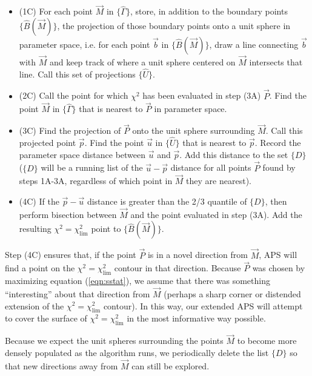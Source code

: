 \documentclass[useAMS,usenatbib]{aastex}
\begin{document}
\begin{itemize}
\item(1C) For each point $\vec{M}$ in $\{\hat{\Gamma}\}$, store, 
in addition to the boundary
points $\{\hat{B}(\vec{M})\}$, the projection of those boundary points
onto a unit sphere in parameter space, i.e. for each point $\vec{b}$ in $\{\hat{B}(\vec{M})\}$, draw a line
connecting $\vec{b}$ with $\vec{M}$ and keep track of
where a unit sphere centered on $\vec{M}$ intersects that line.  Call this set
of projections $\{\hat{U}\}$.
\\
\item(2C) Call the point for which $\chi^2$ has been evaluated in step (3A)
$\vec{P}$.  Find the
point $\vec{M}$ in $\{\hat{\Gamma}\}$ that is nearest to $\vec{P}$ in parameter space.
\\
\item(3C) Find the
projection of $\vec{P}$ onto the unit sphere surrounding $\vec{M}$.  
Call this projected point $\vec{p}$.  Find the point $\vec{u}$ in
$\{\hat{U}\}$ that is nearest to $\vec{p}$.  Record the parameter space 
distance between $\vec{u}$ and $\vec{p}$.
Add this distance to the set $\{D\}$ ($\{D\}$ will be a running list
of the $\vec{u}-\vec{p}$ distance for all points $\vec{P}$ found by steps
1A-3A, regardless of which point in $\vec{M}$ they are nearest).
\\
\item(4C) If the $\vec{p}-\vec{u}$ distance is greater than the 2/3 quantile of $\{D\}$,
then perform bisection between $\vec{M}$ and the point evaluated in step (3A).
Add the resulting $\chi^2=\chi^2_\text{lim}$ point to $\{\hat{B}(\vec{M})\}$.
\end{itemize}

Step (4C) ensures that, if the point $\vec{P}$ is in a novel direction from
$\vec{M}$, APS will find a point on the $\chi^2=\chi^2_\text{lim}$ contour
in that direction.  Because $\vec{P}$ was
chosen by maximizing equation (\ref{eqn:sstat}), we assume that there was something
``interesting'' about that direction from $\vec{M}$ (perhaps a sharp corner or distended
extension of the $\chi^2=\chi^2_\text{lim}$ contour).  In this way, our extended APS
will attempt to cover the surface of $\chi^2=\chi^2_\text{lim}$ in the most informative
way possible.

Because we expect the unit spheres surrounding the points $\vec{M}$ to become more densely
populated as the algorithm runs, we periodically delete the list $\{D\}$ so that
new directions away from $\vec{M}$ can still be explored.
\end{document}
